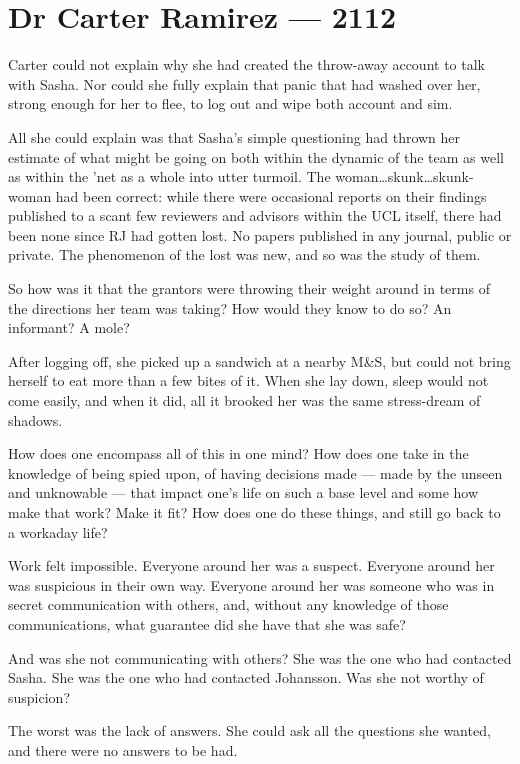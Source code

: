 \hypertarget{dr-carter-ramirez-2112}{%
\chapter*{Dr Carter Ramirez — 2112}\label{dr-carter-ramirez-2112}}

Carter could not explain why she had created the throw-away account to talk with Sasha. Nor could she fully explain that panic that had washed over her, strong enough for her to flee, to log out and wipe both account and sim.

All she could explain was that Sasha's simple questioning had thrown her estimate of what might be going on both within the dynamic of the team as well as within the 'net as a whole into utter turmoil. The woman\ldots{}skunk\ldots{}skunk-woman had been correct: while there were occasional reports on their findings published to a scant few reviewers and advisors within the UCL itself, there had been none since RJ had gotten lost. No papers published in any journal, public or private. The phenomenon of the lost was new, and so was the study of them.

So how was it that the grantors were throwing their weight around in terms of the directions her team was taking? How would they know to do so? An informant? A mole?

After logging off, she picked up a sandwich at a nearby M\&S, but could not bring herself to eat more than a few bites of it. When she lay down, sleep would not come easily, and when it did, all it brooked her was the same stress-dream of shadows.\pagebreak

How does one encompass all of this in one mind? How does one take in the knowledge of being spied upon, of having decisions made — made by the unseen and unknowable — that impact one's life on such a base level and some how make that work? Make it fit? How does one do these things, and still go back to a workaday life?

Work felt impossible. Everyone around her was a suspect. Everyone around her was suspicious in their own way. Everyone around her was someone who was in secret communication with others, and, without any knowledge of those communications, what guarantee did she have that she was safe?

And was she not communicating with others? She was the one who had contacted Sasha. She was the one who had contacted Johansson. Was she not worthy of suspicion?

The worst was the lack of answers. She could ask all the questions she wanted, and there were no answers to be had.

